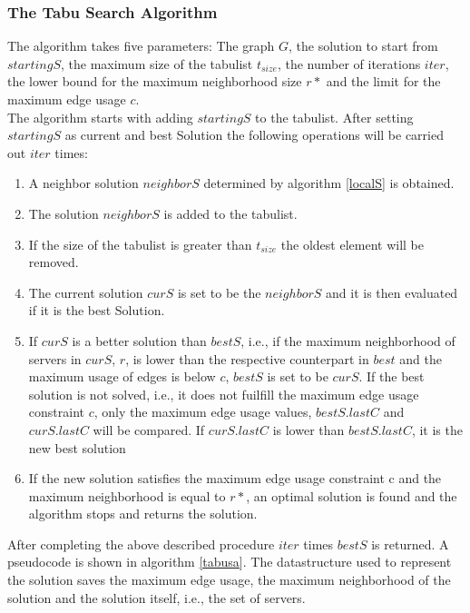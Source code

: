 \documentclass [12pt]{article}
\begin{document}
\subsubsection{The Tabu Search Algorithm}
The algorithm takes five parameters: The graph $G$, the solution
to start from $startingS$, the maximum size of the tabulist $t_{size}$, the number of iterations $iter$, the lower bound for the maximum neighborhood size
$r*$ and the limit for the maximum edge usage $c$.\\
The algorithm starts with adding $startingS$ to the tabulist.  
After setting $startingS$ as current and best Solution the following operations will be carried out $iter$ times: 
\begin{enumerate}
  \item{A neighbor solution $neighborS$ determined by algorithm \ref{localS} is obtained.}
  \item{The solution $neighborS$ is added to the tabulist.}
  \item{If the size of the tabulist is greater than $t_{size}$ the oldest element will be removed.}
  \item{The current solution $curS$ is set to be the $neighborS$ and it is then evaluated if it is the best Solution.}
  \item{If $curS$ is a better solution than $bestS$, i.e., if the maximum neighborhood of servers in $curS$, $r$, is lower than the respective counterpart in 
      $best$ and the maximum usage of edges is below $c$, $bestS$ is set to be $curS$. If the best solution is not solved, i.e., it does not fuilfill the
      maximum edge usage constraint $c$, only the maximum edge usage values,
    $bestS.lastC$ and $curS.lastC$ will be compared. If $curS.lastC$ is lower than $bestS.lastC$, it is the new best solution}
  \item{If the new solution satisfies the maximum edge usage constraint c and the maximum neighborhood is equal to $r*$, an optimal
    solution is found and the algorithm stops and returns the solution.}
\end{enumerate}

After completing the above described procedure $iter$ times $bestS$ is returned.
A pseudocode is shown in algorithm \ref{tabusa}. The datastructure used to represent the solution saves the maximum edge usage, the maximum neighborhood
of the solution and the solution itself, i.e., the set of servers. 
\end{document}
